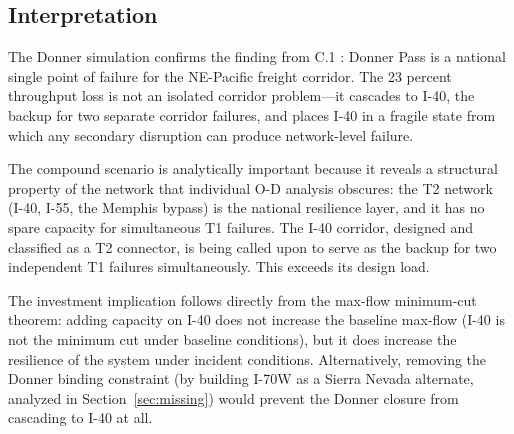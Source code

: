 \subsection{Interpretation}

The Donner simulation confirms the finding from C.1 \citep{ROUTE_C1}: Donner Pass is a national single point of failure for the NE-Pacific freight corridor. The 23 percent throughput loss is not an isolated corridor problem---it cascades to I-40, the backup for two separate corridor failures, and places I-40 in a fragile state from which any secondary disruption can produce network-level failure.

The compound scenario is analytically important because it reveals a structural property of the network that individual O-D analysis obscures: the T2 network (I-40, I-55, the Memphis bypass) is the national resilience layer, and it has no spare capacity for simultaneous T1 failures. The I-40 corridor, designed and classified as a T2 connector, is being called upon to serve as the backup for two independent T1 failures simultaneously. This exceeds its design load.

The investment implication follows directly from the max-flow minimum-cut theorem: adding capacity on I-40 does not increase the baseline max-flow (I-40 is not the minimum cut under baseline conditions), but it does increase the resilience of the system under incident conditions. Alternatively, removing the Donner binding constraint (by building I-70W as a Sierra Nevada alternate, analyzed in Section~\ref{sec:missing}) would prevent the Donner closure from cascading to I-40 at all.
